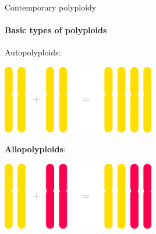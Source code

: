 \documentclass[presentation,sansserif,12pt]{beamer}
\begin{document}

\begin{frame}[t]{Contemporary polyploidy}
\framesubtitle{Basic types of polyploids}

	Autopolyploids:

	\begin{center}
		\includegraphics[width=0.5\textwidth]{eps/autopolyploid-formation}
	\end{center}
	
	\begin{tcolorbox}[colframe=itemcol, colback=white!40!black, coltext=white!95!black]
	\textbf{Allopolyploids}:
	
	\begin{center}
		{\includegraphics[width=0.5\textwidth]{eps/allopolyploid-formation}}
	\end{center}
	\end{tcolorbox}

\end{frame}
\end{document}
